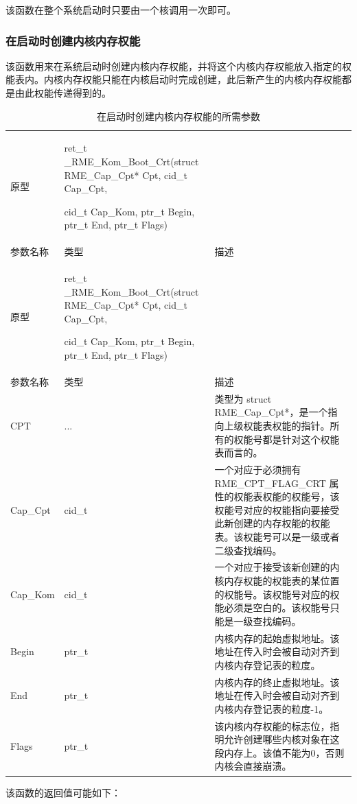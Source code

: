 该函数在整个系统启动时只要由一个核调用一次即可。

\subsubsection{在启动时创建内核内存权能}\label{subsubsec:7-create-kernel-memory-capability-at-boot}

该函数用来在系统启动时创建内核内存权能，并将这个内核内存权能放入指定的权能表内。内核内存权能只能在内核启动时完成创建，此后新产生的内核内存权能都是由此权能传递得到的。

\begin{xltabular}{\textwidth}{@{}>{\hsize\raggedright\arraybackslash}X>{\hsize\raggedright\arraybackslash}X>{\hsize\raggedright\arraybackslash}X@{}}
\caption{在启动时创建内核内存权能的所需参数}\label{tab:7-55-create-kernel-memory-capability-at-boot-parameters}\\
\toprule
原型\strut
 & ret\_t \_RME\_Kom\_Boot\_Crt(struct RME\_Cap\_Cpt* Cpt, cid\_t Cap\_Cpt,

cid\_t Cap\_Kom, ptr\_t Begin, ptr\_t End, ptr\_t Flags)\strut
 & \strut
\tabularnewline
参数名称 & 类型 & 描述\tabularnewline
\endfirsthead
\toprule
原型\strut
 & ret\_t \_RME\_Kom\_Boot\_Crt(struct RME\_Cap\_Cpt* Cpt, cid\_t Cap\_Cpt,

cid\_t Cap\_Kom, ptr\_t Begin, ptr\_t End, ptr\_t Flags)\strut
 & \strut
\tabularnewline
参数名称 & 类型 & 描述\tabularnewline
\midrule
\endhead
\bottomrule
\endlastfoot
CPT & ... &
类型为 struct RME\_Cap\_Cpt*，是一个指向上级权能表权能的指针。所有的权能号都是针对这个权能表而言的。\tabularnewline
Cap\_Cpt & cid\_t &
一个对应于必须拥有 RME\_CPT\_FLAG\_CRT 属性的权能表权能的权能号，该权能号对应的权能指向要接受此新创建的内存权能的权能表。该权能号可以是一级或者二级查找编码。\tabularnewline
Cap\_Kom & cid\_t &
一个对应于接受该新创建的内核内存权能的权能表的某位置的权能号。该权能号对应的权能必须是空白的。该权能号只能是一级查找编码。\tabularnewline
Begin & ptr\_t &
内核内存的起始虚拟地址。该地址在传入时会被自动对齐到内核内存登记表的粒度。\tabularnewline
End & ptr\_t &
内核内存的终止虚拟地址。该地址在传入时会被自动对齐到内核内存登记表的粒度-1。\tabularnewline
Flags & ptr\_t &
该内核内存权能的标志位，指明允许创建哪些内核对象在这段内存上。该值不能为0，否则内核会直接崩溃。\tabularnewline
\end{xltabular}

该函数的返回值可能如下：

